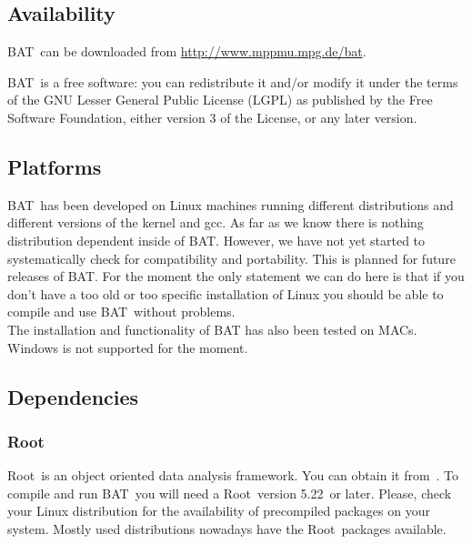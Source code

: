\documentclass[11pt, a4paper]{article}
\newcommand{\bat}{{\sc BAT}}
\newcommand{\Root}{{\sc Root}}
\newcommand{\RootVersion}{5.22}
\begin{document}
\subsection{Availability}

\bat\ can be downloaded from \url{http://www.mppmu.mpg.de/bat}.

\bigskip

\noindent
\bat\ is a free software: you can redistribute it and/or modify it
under the terms of the GNU Lesser General Public License (LGPL) as
published by the Free Software Foundation, either version 3 of
the License, or any later version.


\subsection{Platforms}

\bat\ has been developed on Linux machines running different distributions
and different versions of the kernel and gcc. As far as we know there
is nothing distribution dependent inside of \bat. However, we have not
yet started to systematically check for compatibility and
portability. This is planned for future releases of \bat. For the
moment the only statement we can do here is that if you don't have a
too old or too specific installation of Linux you should be able to
compile and use \bat\ without problems. \\

\noindent
The installation and functionality of BAT has also been tested on MACs. \\

\noindent
Windows is not supported for the moment.


\subsection{Dependencies}

\subsubsection{\Root}
\Root\ is an object oriented data analysis framework. You can obtain it
from~\cite{ROOTweb}. To compile and run \bat\ you will need a \Root\
version \RootVersion\ or later. Please, check your Linux distribution for the
availability of precompiled packages on your system. Mostly used
distributions nowadays have the \Root\ packages available. \\
\end{document}
